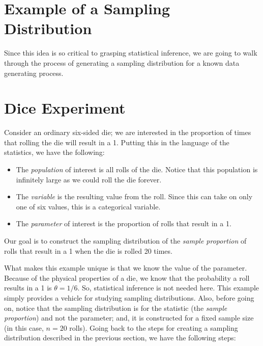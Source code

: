 \documentclass[
  letterpaper,
  DIV=11,
  numbers=noendperiod]{scrreprt}
\providecommand{\tightlist}{%
  \setlength{\itemsep}{0pt}\setlength{\parskip}{0pt}}\usepackage{longtable,booktabs,array}
\theoremstyle{definition}
\theoremstyle{definition}
\theoremstyle{plain}
\theoremstyle{remark}
\begin{document}
\hypertarget{example-of-a-sampling-distribution}{%
\section{Example of a Sampling
Distribution}\label{example-of-a-sampling-distribution}}

Since this idea is so critical to grasping statistical inference, we are
going to walk through the process of generating a sampling distribution
for a known data generating process.

\hypertarget{ex-samplingdistns-dice}{}
\hypertarget{dice-experiment}{%
\section{Dice Experiment}\label{dice-experiment}}

Consider an ordinary six-sided die; we are interested in the proportion
of times that rolling the die will result in a 1. Putting this in the
language of the statistics, we have the following:

\begin{itemize}
\tightlist
\item
  The \emph{population} of interest is all rolls of the die. Notice that
  this population is infinitely large as we could roll the die forever.
\item
  The \emph{variable} is the resulting value from the roll. Since this
  can take on only one of six values, this is a categorical variable.
\item
  The \emph{parameter} of interest is the proportion of rolls that
  result in a 1.
\end{itemize}

Our goal is to construct the sampling distribution of the \emph{sample
proportion} of rolls that result in a 1 when the die is rolled 20 times.

What makes this example unique is that we know the value of the
parameter. Because of the physical properties of a die, we know that the
probability a roll results in a 1 is \(\theta = 1/6\). So, statistical
inference is not needed here. This example simply provides a vehicle for
studying sampling distributions. Also, before going on, notice that the
sampling distribution is for the statistic (the \emph{sample
proportion}) and not the parameter; and, it is constructed for a fixed
sample size (in this case, \(n = 20\) rolls). Going back to the steps
for creating a sampling distribution described in the previous section,
we have the following steps:
\end{document}
